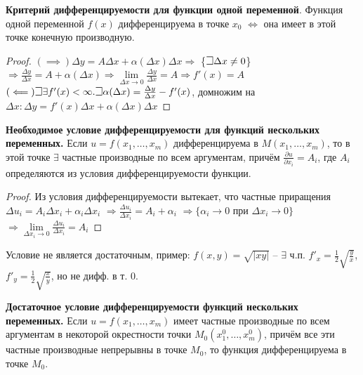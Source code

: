 \textbf{Критерий дифференцируемости для функции одной переменной}. Функция одной переменной $f(x)$ дифференцируема в точке $x_0$ $\iff$ она имеет в этой точке конечную производную.

\begin{proof} 
$(\implies) \Delta y = A \Delta x + \alpha(\Delta x)\Delta x \Rightarrow$ \{$\mathLet \Delta x \neq 0$\} $\Rightarrow \frac{\Delta y}{\Delta x}=A + \alpha(\Delta x) \Rightarrow \lim\limits_{\Delta x \to 0}\frac{\Delta y}{\Delta x}=A \Rightarrow f'(x) = A$\\
$(\impliedby) \mathLet \exists f'(x) < \infty. \mathLet \alpha(\Delta x)=\frac{\Delta y}{\Delta x}-f'(x)$, домножим на $\Delta x: \Delta y=f'(x)\Delta x+\alpha(\Delta x)\Delta x$
\end{proof}
\bigbreak

\textbf{Необходимое условие дифференцируемости для функций нескольких переменных.} Если $u = f(x_1,\dots,x_m)$ дифференцируема в $M(x_1,\dots,x_m)$, то в этой точке $\exists$ частные производные по всем аргументам, причём $\frac{\partial u}{\partial x_i} = A_i$, где $A_i$ определяются из условия дифференцируемости функции.

\begin{proof}
Из условия дифференцируемости вытекает, что частные приращения 
$\Delta u_i = A_i\Delta x_i+\alpha_i\Delta x_i$
$\Rightarrow \frac{\Delta u_i}{\Delta x_i} = A_i + \alpha_i $
$\Rightarrow \{\alpha_i \to 0$ при $\Delta x_i \to 0\} $
$\Rightarrow \lim\limits_{\Delta x_i \to 0}\frac{\Delta u_i}{\Delta x_i}=A_i$
\end{proof}

Условие не является достаточным, пример: $f(x, y) = \sqrt{\left|xy\right|}$ -- $\exists$ ч.п. 
$f'_x = \frac{1}{2} \sqrt{\frac{y}{x}}$, $f'_y = \frac{1}{2} \sqrt{\frac{x}{y}}$, но не дифф. в т. 0.
\bigbreak

\textbf{Достаточное условие дифференцируемости функций нескольких переменных.} Если $u = f(x_1,\dots,x_m)$ имеет частные производные по всем аргументам в некоторой окрестности точки $M_0(x^0_1, \dots, x^0_m)$, причём все эти частные производные непрерывны в точке $M_0$, то функция дифференцируема в точке $M_0$.


